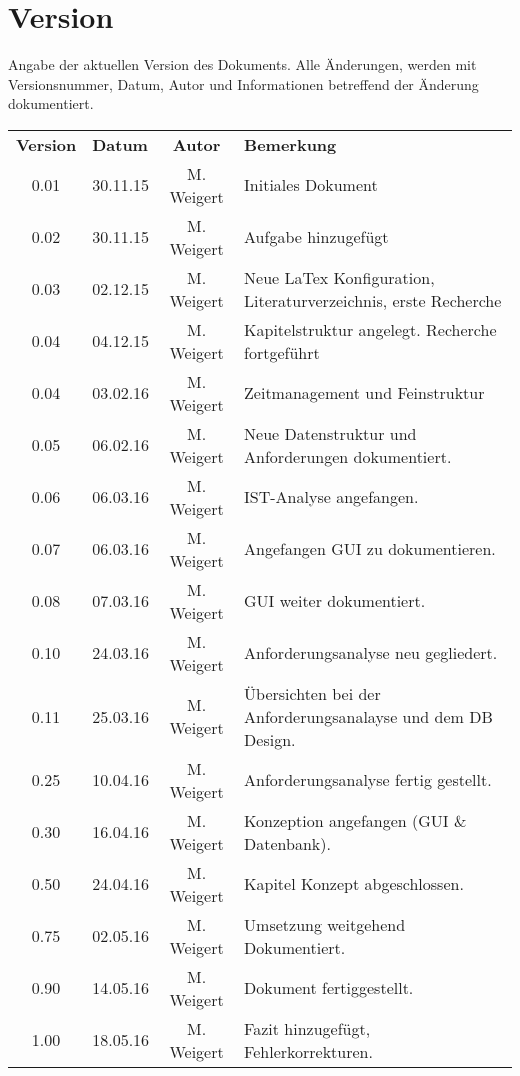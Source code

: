 \chapter*{Version}

Angabe der aktuellen Version des Dokuments. Alle Änderungen, werden mit Versionsnummer, Datum, Autor und Informationen betreffend der Änderung dokumentiert.\\

\begin{tabular}{|c|l|c|l|}
	\rowcolor{black} {\color{white}\textbf{Version}} & {\color{white}\textbf{Datum}} & {\color{white}\textbf{Autor}} & {\color{white}\textbf{Bemerkung}} \\
	0.01 & 30.11.15 & M. Weigert & Initiales Dokument \\ \hline
	\rowcolor{DarkSeaGreen} 0.02 & 30.11.15 & M. Weigert & Aufgabe hinzugefügt \\ \hline
	0.03 & 02.12.15 & M. Weigert & Neue LaTex Konfiguration, Literaturverzeichnis, erste Recherche \\ \hline
	\rowcolor{DarkSeaGreen} 0.04 & 04.12.15 & M. Weigert & Kapitelstruktur angelegt. Recherche fortgeführt \\ \hline
	0.04 & 03.02.16 & M. Weigert & Zeitmanagement und Feinstruktur \\ \hline
	\rowcolor{DarkSeaGreen} 0.05 & 06.02.16 & M. Weigert & Neue Datenstruktur und Anforderungen dokumentiert. \\ \hline
	0.06 & 06.03.16 & M. Weigert & IST-Analyse angefangen. \\ \hline
	\rowcolor{DarkSeaGreen} 0.07 & 06.03.16 & M. Weigert & Angefangen GUI zu dokumentieren. \\ \hline
	0.08 & 07.03.16 & M. Weigert & GUI weiter dokumentiert. \\ \hline
	\rowcolor{DarkSeaGreen} 0.10 & 24.03.16 & M. Weigert & Anforderungsanalyse neu gegliedert. \\ \hline
	0.11 & 25.03.16 & M. Weigert & Übersichten bei der Anforderungsanalayse und dem DB Design. \\ \hline
	\rowcolor{DarkSeaGreen} 0.25 & 10.04.16 & M. Weigert & Anforderungsanalyse fertig gestellt. \\ \hline
	0.30 & 16.04.16 & M. Weigert & Konzeption angefangen (GUI \& Datenbank). \\ \hline
	\rowcolor{DarkSeaGreen} 0.50 & 24.04.16 & M. Weigert & Kapitel Konzept abgeschlossen. \\ \hline
	0.75 & 02.05.16 & M. Weigert & Umsetzung weitgehend Dokumentiert. \\ \hline
	\rowcolor{DarkSeaGreen} 0.90 & 14.05.16 & M. Weigert & Dokument fertiggestellt. \\ \hline
	1.00 & 18.05.16 & M. Weigert & Fazit hinzugefügt, Fehlerkorrekturen. \\ \hline
\end{tabular}